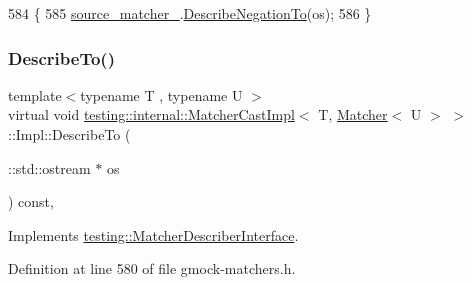 \begin{DoxyCode}
584                                                           \{
585       \hyperlink{classtesting_1_1internal_1_1MatcherCastImpl_3_01T_00_01Matcher_3_01U_01_4_01_4_1_1Impl_a812216395addd6e4bcfe54317ae42236}{source\_matcher\_}.\hyperlink{classtesting_1_1internal_1_1MatcherBase_ac1089d49b6b8a381900618985cd69b7f}{DescribeNegationTo}(os);
586     \}
\end{DoxyCode}
\mbox{\label{classtesting_1_1internal_1_1MatcherCastImpl_3_01T_00_01Matcher_3_01U_01_4_01_4_1_1Impl_a42677b4e3e3d7b9c8610e33c399f9154}} 
\subsubsection{\texorpdfstring{Describe\+To()}{DescribeTo()}}
{\footnotesize\ttfamily template$<$typename T , typename U $>$ \\
virtual void \hyperlink{classtesting_1_1internal_1_1MatcherCastImpl}{testing\+::internal\+::\+Matcher\+Cast\+Impl}$<$ T, \hyperlink{classtesting_1_1Matcher}{Matcher}$<$ U $>$ $>$\+::Impl\+::\+Describe\+To (\begin{DoxyParamCaption}\item[{\+::std\+::ostream $\ast$}]{os }\end{DoxyParamCaption}) const\hspace{0.3cm}{\ttfamily [inline]}, {\ttfamily [virtual]}}



Implements \hyperlink{classtesting_1_1MatcherDescriberInterface_ad9f861588bd969b6e3e717f13bb94e7b}{testing\+::\+Matcher\+Describer\+Interface}.



Definition at line 580 of file gmock-\/matchers.\+h.


